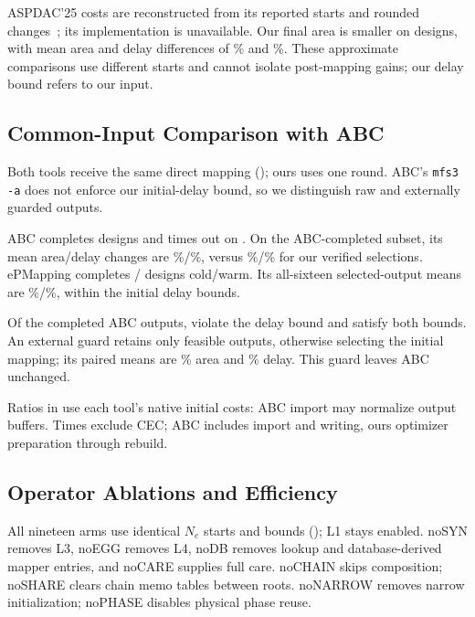 ASPDAC'25 costs are reconstructed from its reported starts and rounded changes~\cite{aspdac25}; its implementation is unavailable. Our final area is smaller on \MainWins{} designs, with mean area and delay differences of \mbox{\MainAreaAll\%} and \mbox{\MainDelayAll\%}. These approximate comparisons use different starts and cannot isolate post-mapping gains; our delay bound refers to our input.

\subsection{Common-Input Comparison with ABC}\label{sec:mfs3}
Both tools receive the same direct mapping (); ours uses one round. ABC's \texttt{mfs3 -a} does not enforce our initial-delay bound, so we distinguish raw and externally guarded outputs.

ABC completes \ABCCompleted{} designs and times out on \ABCTimeouts{}. On the ABC-completed subset, its mean area/delay changes are \mbox{\ABCArea\%}/\mbox{\ABCDelay\%}, versus \mbox{\PairedOwnArea\%}/\mbox{\PairedOwnDelay\%} for our verified selections. ePMapping completes \ColdMfsCompleted{}/\WarmMfsCompleted{} designs cold/warm. Its all-sixteen selected-output means are \mbox{\MfsOwnArea\%}/\mbox{\MfsOwnDelay\%}, within the initial delay bounds.

Of the completed ABC outputs, \ABCViolations{} violate the delay bound and \ABCFeasible{} satisfy both bounds. An external guard retains only feasible outputs, otherwise selecting the initial mapping; its paired means are \mbox{\ABCGuardArea\%} area and \mbox{\ABCGuardDelay\%} delay. This guard leaves ABC unchanged.

Ratios in  use each tool's native initial costs: ABC import may normalize output buffers. Times exclude CEC; ABC includes import and writing, ours optimizer preparation through rebuild.

\subsection{Operator Ablations and Efficiency}\label{sec:oracles}
\AblationResultTable


All nineteen arms use identical $N_e$ starts and bounds (); L1 stays enabled. noSYN removes L3, noEGG removes L4, noDB removes lookup and database-derived mapper entries, and noCARE supplies full care. noCHAIN skips composition; noSHARE clears chain memo tables between roots. noNARROW removes narrow initialization; noPHASE disables physical phase reuse.

